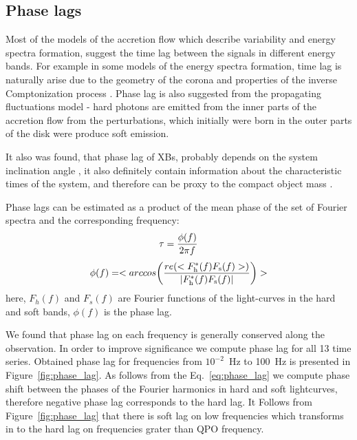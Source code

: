 \documentclass[a4paper,fleqn,usenatbib]{mnras}
\begin{document}

\subsection{Phase lags}
    Most of the models of the accretion flow which describe variability and energy spectra formation, suggest the time lag between the signals in different energy bands. 
For example in some models of the energy spectra formation, time lag is naturally arise due to the geometry of the corona and properties of the inverse Comptonization process \citep[see, e.g.][]{kotov01}.
Phase lag is also suggested from the propagating fluctuations model - hard photons are emitted from the inner parts of the accretion flow from the perturbations, which initially were born in the outer parts of the disk were produce soft emission.  

It also was found, that phase lag of XBs, probably depends on the system inclination angle \citep{eijeden17}, it also definitely contain information about the characteristic times of the system, and therefore can be proxy to the compact object mass \citep{}. 

Phase lags can be estimated as a product of the mean phase of the set of Fourier spectra and the corresponding frequency:
\begin{equation}
                \tau = \frac{\phi(f)}{2\pi f}\\
\end{equation}
\begin{equation}
        \phi(f) = <arccos{\left(\frac{re(<F_{\rm h}^{*}(f)F_{\rm s}(f)>)}{|F_{\rm h}^{*}(f) F_{\rm s}(f)|}\right)}>
        \label{eq:phase_lag}
\end{equation}
here, $F_h(f)$ and $F_s(f)$ are Fourier functions of the light-curves in the hard and soft bands, $\phi(f)$ is the phase lag. 

We found that phase lag on each frequency is generally conserved along the observation.
In order to improve significance we compute phase lag for all 13 time series.
Obtained phase lag for frequencies from $10^{-2}$~Hz to 100~Hz is presented in Figure~\ref{fig:phase_lag}.
As follows from the Eq.~\ref{eq:phase_lag} we compute phase shift between the phases of the Fourier harmonics in hard and soft lightcurves, therefore negative phase lag corresponds to the hard lag.
It Follows from Figure~\ref{fig:phase_lag} that there is soft lag on low frequencies which transforms in to the hard lag on frequencies grater than QPO frequency. 
\end{document}
